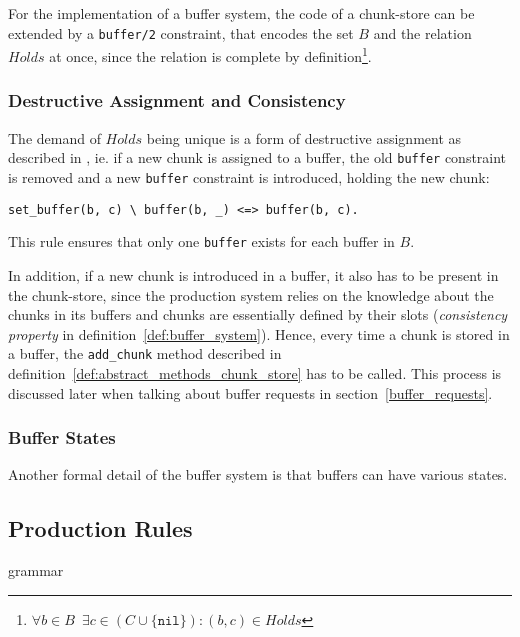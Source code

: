 For the implementation of a buffer system, the code of a chunk-store can be extended by a \verb|buffer/2| constraint, that encodes the set $B$ and the relation $Holds$ at once, since the relation is complete by definition\footnote{$\forall b \in B \enspace \exists c \in (C \cup \{ \mathtt{nil} \}): (b,c) \in Holds$}.

\subsubsection{Destructive Assignment and Consistency}

The demand of $Holds$ being unique is a form of destructive assignment as described in \cite[p. 32]{fru_chr_book_2009}, ie. if a new chunk is assigned to a buffer, the old \verb|buffer| constraint is removed and a new \verb|buffer| constraint is introduced, holding the new chunk:

\begin{lstlisting}
set_buffer(b, c) \ buffer(b, _) <=> buffer(b, c).
\end{lstlisting}

This rule ensures that only one \verb|buffer| exists for each buffer in $B$.

In addition, if a new chunk is introduced in a buffer, it also has to be present in the chunk-store, since the production system relies on the knowledge about the chunks in its buffers and chunks are essentially defined by their slots (\emph{consistency property} in definition~\ref{def:buffer_system}). Hence, every time a chunk is stored in a buffer, the \verb|add_chunk| method described in definition~\ref{def:abstract_methods_chunk_store} has to be called. This process is discussed later when talking about buffer requests in section~\ref{buffer_requests}.

\subsubsection{Buffer States}

Another formal detail of the buffer system is that buffers can have various states.

\subsection{Production Rules}

grammar

